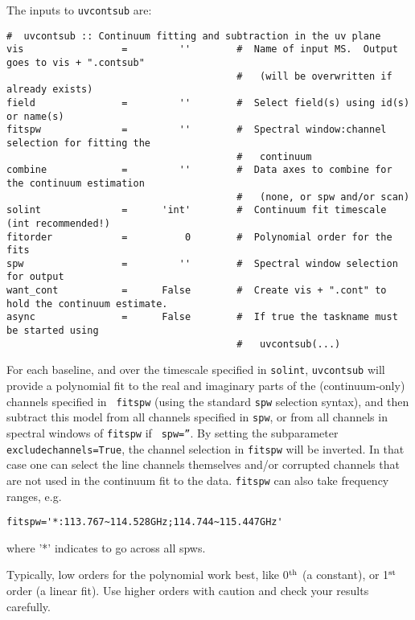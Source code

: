 The inputs to {\tt uvcontsub} are:
\small
\begin{verbatim}
#  uvcontsub :: Continuum fitting and subtraction in the uv plane
vis                 =         ''        #  Name of input MS.  Output goes to vis + ".contsub"
                                        #   (will be overwritten if already exists)
field               =         ''        #  Select field(s) using id(s) or name(s)
fitspw              =         ''        #  Spectral window:channel selection for fitting the
                                        #   continuum
combine             =         ''        #  Data axes to combine for the continuum estimation
                                        #   (none, or spw and/or scan)
solint              =      'int'        #  Continuum fit timescale (int recommended!)
fitorder            =          0        #  Polynomial order for the fits
spw                 =         ''        #  Spectral window selection for output
want_cont           =      False        #  Create vis + ".cont" to hold the continuum estimate.
async               =      False        #  If true the taskname must be started using
                                        #   uvcontsub(...)
\end{verbatim}
\normalsize

For each baseline, and over the timescale specified in {\tt solint},
{\tt uvcontsub} will provide a polynomial fit to the real and
imaginary parts of the (continuum-only) channels specified in {\tt
fitspw} (using the standard {\tt spw} selection syntax), 
and then subtract this model from all channels specified in {\tt spw}, or
from all channels in spectral windows of {\tt fitspw} if {\tt
  spw=''}. By setting the subparameter {\tt excludechannels=True}, the
channel selection in {\tt fitspw} will be inverted. In that case one
can select the line channels themselves and/or corrupted channels that
are not used in the continuum fit to the data. {\tt fitspw} can also
take frequency ranges, e.g. 

\small
\begin{verbatim}
fitspw='*:113.767~114.528GHz;114.744~115.447GHz'
\end{verbatim}
\normalsize

where '*' indicates to go across all spws. 


Typically, low orders for the polynomial work best, like 0$^{\rm th}$ (a
constant), or 1$^{\rm st}$ order (a linear fit). Use higher orders with caution
and check your results carefully.

